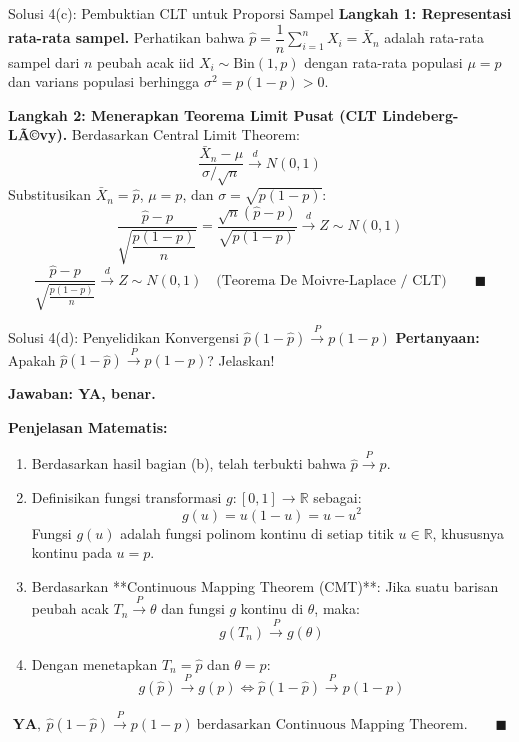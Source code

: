 \documentclass[10pt,twoside]{article}
\begin{document}
\begin{solbox}{Solusi 4(c): Pembuktian CLT untuk Proporsi Sampel}
\textbf{Langkah 1: Representasi rata-rata sampel.}
Perhatikan bahwa $\hat{p} = \dfrac{1}{n}\sum_{i=1}^n X_i = \bar{X}_n$ adalah rata-rata sampel dari $n$ peubah acak iid $X_i \sim \text{Bin}(1, p)$ dengan rata-rata populasi $\mu = p$ dan varians populasi berhingga $\sigma^2 = p(1-p) > 0$.

\textbf{Langkah 2: Menerapkan Teorema Limit Pusat (CLT Lindeberg-LÃ©vy).}
Berdasarkan Central Limit Theorem:
\[
\frac{\bar{X}_n - \mu}{\sigma / \sqrt{n}} \xrightarrow{d} N(0, 1)
\]
Substitusikan $\bar{X}_n = \hat{p}$, $\mu = p$, dan $\sigma = \sqrt{p(1-p)}$:
\[
\frac{\hat{p} - p}{\sqrt{\dfrac{p(1-p)}{n}}} = \frac{\sqrt{n}(\hat{p} - p)}{\sqrt{p(1-p)}} \xrightarrow{d} Z \sim N(0, 1)
\]
\[
\boxed{\frac{\hat{p}-p}{\sqrt{\frac{p(1-p)}{n}}} \xrightarrow{d} Z \sim N(0, 1) \quad \text{(Teorema De Moivre-Laplace / CLT)}} \qquad \blacksquare
\]
\end{solbox}

\begin{solbox}{Solusi 4(d): Penyelidikan Konvergensi $\hat{p}(1-\hat{p}) \xrightarrow{P} p(1-p)$}
\textbf{Pertanyaan:} Apakah $\hat{p}(1-\hat{p}) \xrightarrow{P} p(1-p)$? Jelaskan!

\textbf{Jawaban: YA, benar.}

\textbf{Penjelasan Matematis:}
\begin{enumerate}[label=\arabic*.]
  \item Berdasarkan hasil bagian (b), telah terbukti bahwa $\hat{p} \xrightarrow{P} p$.
  \item Definisikan fungsi transformasi $g: [0, 1] \to \mathbb{R}$ sebagai:
  \[
  g(u) = u(1 - u) = u - u^2
  \]
  Fungsi $g(u)$ adalah fungsi polinom kontinu di setiap titik $u \in \mathbb{R}$, khususnya kontinu pada $u = p$.
  \item Berdasarkan **Continuous Mapping Theorem (CMT)**: Jika suatu barisan peubah acak $T_n \xrightarrow{P} \theta$ dan fungsi $g$ kontinu di $\theta$, maka:
  \[
  g(T_n) \xrightarrow{P} g(\theta)
  \]
  \item Dengan menetapkan $T_n = \hat{p}$ dan $\theta = p$:
  \[
  g(\hat{p}) \xrightarrow{P} g(p) \iff \hat{p}(1 - \hat{p}) \xrightarrow{P} p(1 - p)
  \]
\end{enumerate}

\[
\boxed{\textbf{YA}, \ \hat{p}(1-\hat{p}) \xrightarrow{P} p(1-p) \ \text{berdasarkan Continuous Mapping Theorem.}} \qquad \blacksquare
\]
\end{solbox}
\end{document}
